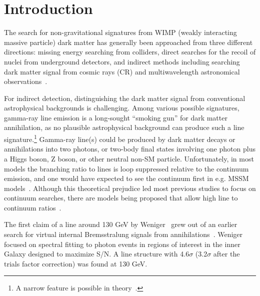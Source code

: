 \documentclass[aps,twocolumn,prd,superscriptaddress,showpacs,nofootinbib,fixfloat]{revtex4}
\begin{document}


\section{Introduction}


The search for non-gravitational signatures from WIMP
(weakly interacting massive particle) dark matter has 
generally been approached from three different directions: missing
energy searching from colliders, direct searches for the
recoil of nuclei from underground detectors, and indirect
methods including searching dark matter signal from cosmic
rays (CR) and multiwavelength astronomical
observations~\citep{Jungman:1995df,Bergstrom:2000,Bertone:2005,Hooper:2007Review,
  2012arXiv1205.4882B}.

For indirect detection, distinguishing the dark matter
signal from conventional astrophysical backgrounds is
challenging.  Among various possible signatures, gamma-ray
line emission is a long-sought ``smoking
gun'' for dark matter annihilation, as no plausible
astrophysical background can produce such a line
signature.\footnote{A narrow feature is
possible in theory~\citep[see][]{2012arXiv1207.0458A}.}  Gamma-ray line(s)
could be produced by dark matter decays or annihilations
into two photons, or two-body final states involving one
photon plus a Higgs boson, Z boson, or other neutral non-SM
particle. Unfortunately, in most models the branching ratio
to lines is loop suppressed relative to the continuum
emission, and one would have expected to see the continuum
first in e.g. MSSM models~\citep[e.g.][]{Bergstrom:1997}.
Although this theoretical prejudice led most previous
studies to focus on continuum searches, there are models
being proposed that allow high line to continuum
ratios~\citep[e.g.][]{Bergstrom:1998, Bergstrom:2000,
  Bertone:2009, Jackson:2010, Cline:2012, Weiner:2012}.

The first claim of a line around 130 GeV by
Weniger~\citep{Weniger:2012} grew out of an earlier search
for virtual internal Bremsstralung signals from
annihilations~\citep{Bringmann:2012}.  Weniger focused on
spectral fitting to photon events in regions of interest in
the inner Galaxy designed to maximize S/N.  A line structure
with 4.6$\sigma$ (3.2$\sigma$ after the trials factor
correction) was found at 130 GeV.
\end{document}

